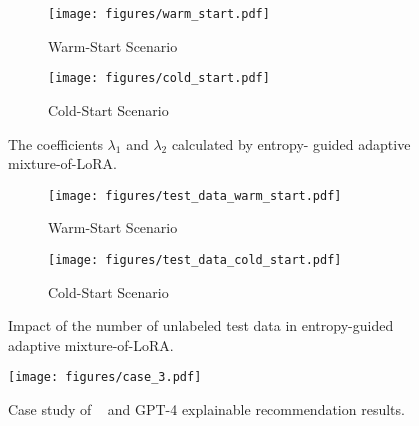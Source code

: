 \begin{figure}[ht]
    \centering
    \begin{subfigure}[t]{0.23\textwidth}
        \centering
    \texttt{[image: figures/warm\_start.pdf]}
        \caption{Warm-Start Scenario}
        \label{fig:coeff_1}
    \end{subfigure}
    \begin{subfigure}[t]{0.23\textwidth}
\texttt{[image: figures/cold\_start.pdf]}
        \centering
        \caption{Cold-Start Scenario}
        \label{fig:coeff_2}
    \end{subfigure}
    \vspace{-2mm}
\caption{The coefficients $\lambda_1$ and $\lambda_2$ calculated by entropy- guided adaptive mixture-of-LoRA.}
\label{fig:ts}
\end{figure}

\begin{figure}[ht]
    \centering
    \begin{subfigure}[t]{0.23\textwidth}
        \centering
    \texttt{[image: figures/test\_data\_warm\_start.pdf]}
        \caption{Warm-Start Scenario}
        \label{fig:111}
    \end{subfigure}
    \begin{subfigure}[t]{0.23\textwidth}
\texttt{[image: figures/test\_data\_cold\_start.pdf]}
        \centering
        \caption{Cold-Start Scenario}
        \label{fig:222}
    \end{subfigure}
    \vspace{-2mm}
\caption{Impact of the number of unlabeled test data in entropy-guided adaptive mixture-of-LoRA.}
\label{fig:test_data}
\end{figure}


\begin{figure}[ht]
    \centering
    \texttt{[image: figures/case\_3.pdf]}
    \vspace{-0.4cm}
    \caption{Case study of \shortname~ and GPT-4 explainable recommendation results.}
    \vspace{-0.4cm}
    \label{fig:case}
    \Description{}
\end{figure}







